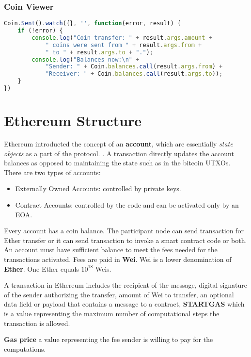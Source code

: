 \documentclass{article}
\begin{document}
\subsubsection{Coin Viewer}
\begin{lstlisting}[language=JavaScript]
Coin.Sent().watch({}, '', function(error, result) {
    if (!error) {
        console.log("Coin transfer: " + result.args.amount +
            " coins were sent from " + result.args.from +
            " to " + result.args.to + ".");
        console.log("Balances now:\n" +
            "Sender: " + Coin.balances.call(result.args.from) +
            "Receiver: " + Coin.balances.call(result.args.to));
    }
})

\end{lstlisting}

\section{Ethereum Structure}
Ethereum introducted the concept of an \textbf{account}, which are essentially \textit{state objects} as a part of the protocol. . A transaction directly updates the account balances as opposed to maintaining the state such as in the bitcoin UTXOs. \\
There are two types of accounts:
\begin{itemize}
    \item Externally Owned Accounts: controlled by private keys. 
    \item Contract Accounts: controlled by the code and can be activated only by an EOA.
\end{itemize} 
Every account has a coin balance. The participant node can send transaction for Ether transfer or it can send transaction to invoke a smart contract code or both. An account must have sufficient balance to meet the fees needed for the transactions activated. Fees are paid in \textbf{Wei}. Wei is a lower denomination of \textbf{Ether}. One Ether equals $10^{18}$ Weis. \par
A transaction in Ethereum includes the recipient of the message, digital signature of the sender authorizing the transfer, amount of Wei to transfer, an optional data field or payload that contains a message to a contract, \textbf{STARTGAS} which is a value representing the maximum number of computational steps the transaction is allowed.
\par \textbf{Gas price} a value representing the fee sender is willing to pay for the computations. 
\end{document}
